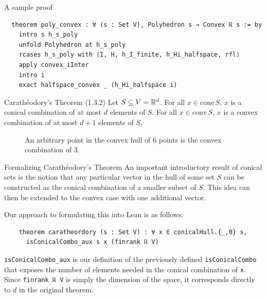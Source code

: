 \documentclass[final]{beamer}
\newlength{\colwidth}
\begin{document}
\begin{frame}[fragile]
\begin{columns}[t]
\begin{column}{\colwidth}
\vspace{1em}


            \begin{exampleblock}{A sample proof}
            \vspace{-0.5em}
\begin{Verbatim}
  theorem poly_convex : ∀ (s : Set V), Polyhedron s → Convex ℝ s := by
    intro s h_s_poly
    unfold Polyhedron at h_s_poly
    rcases h_s_poly with ⟨I, H, h_I_finite, h_Hi_halfspace, rfl⟩
    apply convex_iInter
    intro i
    exact halfspace_convex _ (h_Hi_halfspace i)
\end{Verbatim}
            \end{exampleblock}


            \begin{alertblock}{Carath\'eodory's Theorem (1.3.2)}
              Let $S \subseteq V = \mathbb{R}^d$. For all $x \in \text{cone}\,S$, $x$ is a conical combination of at most $d$ elements of $S$. For all $x \in \text{conv}\,S$, $x$ is a convex combination of at most $d + 1$ elements of $S$. 
            \end{alertblock}

            \begin{figure}[htbp]
                    \centering
                    
                    \caption{An arbitrary point in the convex hull of 6 points is the convex combination of 3.\label{fig:caratheodory}}
            \end{figure}

            \begin{block}{Formalizing Carath\'eodory's Theorem}
              An important introductory result of conical sets is the notion that any particular vector in the hull of some set $S$ can be constructed as the conical combination of a smaller subset of $S$. This idea can then be extended to the convex case with one additional vector.

              Our approach to formulating this into Lean is as follows:
\begin{Verbatim}
    theorem caratheordory (s : Set V) : ∀ x ∈ conicalHull.{_,0} s, 
      isConicalCombo_aux s x (finrank ℝ V) 
\end{Verbatim}
              \verb|isConicalCombo_aux| is our definition of the previously defined \verb|isConicalCombo| that exposes the number of elements needed in the conical combination of \verb|x|. Since \verb|finrank ℝ V| is simply the dimension of the space, it corresponds directly to $d$ in the original theorem.


\end{block}
\end{column}
\end{columns}
\end{frame}
\end{document}
